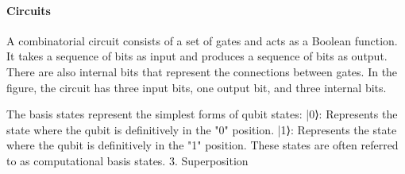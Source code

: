 \paragraph{Circuits}
A combinatorial circuit consists of a set of gates and acts as a Boolean function. It takes a sequence of bits as input and produces a sequence of bits as output. There are also internal bits that represent the connections between gates. In the figure, the circuit has three input bits, one output bit, and three internal bits.


The basis states represent the simplest forms of qubit states:
|0⟩: Represents the state where the qubit is definitively in the "0" position.
|1⟩: Represents the state where the qubit is definitively in the "1" position.
These states are often referred to as computational basis states.
3. Superposition

